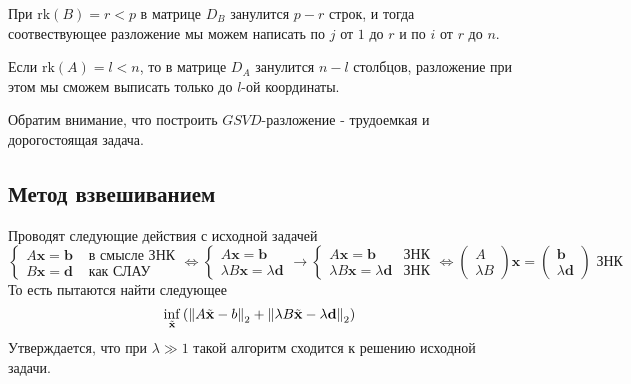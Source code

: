 \begin{remark}
  При $\text{rk}(B)=r<p$ в матрице $D_B$ занулится $p-r$ строк, и
  тогда соотвествующее разложение мы можем написать по $j$ от $1$ до $r$
  и по $i$ от $r$ до $n$.

  Если $\text{rk}(A)=l<n$, то в матрице $D_A$ занулится $n-l$ столбцов,
  разложение при этом мы сможем выписать только до $l$-ой координаты.
\end{remark}

Обратим внимание, что построить $GSVD$-разложение - трудоемкая и дорогостоящая задача.

\subsection*{Метод взвешиванием}

Проводят следующие действия с исходной задачей
\[\left\{\begin{array}{cc}
    A\mathbf{x}=\mathbf{b} & \text{ в смысле ЗНК} \\
    B\mathbf{x}=\mathbf{d} & \text{ как СЛАУ}
  \end{array}\right.\Leftrightarrow
  \left\{\begin{array}{c}
    A\mathbf{x}=\mathbf{b} \\
    \lambda B\mathbf{x}=\lambda \mathbf{d}
  \end{array}\right.\rightarrow
  \left\{\begin{array}{cc}
    A\mathbf{x}=\mathbf{b}                 & \text{ЗНК} \\
    \lambda B\mathbf{x}=\lambda \mathbf{d} & \text{ЗНК}
  \end{array}\right.\Leftrightarrow
  \left(\begin{array}{c}
      A \\
      \lambda B
    \end{array}\right) \mathbf{x} = \left(\begin{array}{c}
      \mathbf{b} \\
      \lambda \mathbf{d}
    \end{array}\right) \text{ ЗНК}\]
То есть пытаются найти следующее
\begin{equation}\label{eq:weight_method}
  \inf_{\tilde{\mathbf{x}}}\left(\left\lVert A\tilde{\mathbf{x}}-b\right\rVert_2+\left\lVert\lambda B\tilde{\mathbf{x}}-\lambda\mathbf{d}\right\rVert_2\right)
\end{equation}
Утверждается, что при $\lambda\gg1$ такой алгоритм сходится к решению
исходной задачи.

